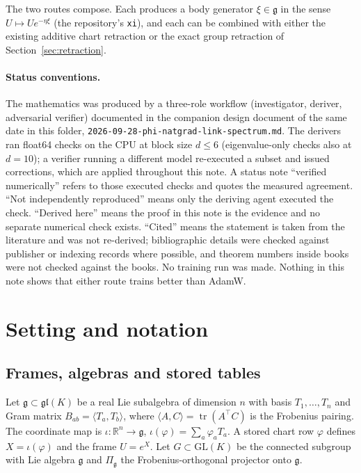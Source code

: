 \documentclass[11pt]{article}
\theoremstyle{definition}
\theoremstyle{remark}
\newcommand{\R}{\mathbb{R}}
\newcommand{\g}{\mathfrak{g}}
\newcommand{\gl}{\mathfrak{gl}}
\newcommand{\GL}{\mathrm{GL}}
\newcommand{\tr}{\operatorname{tr}}
\newcommand{\ip}[2]{\langle #1, #2\rangle}
\begin{document}
The two routes compose. Each produces a body generator $\xi\in\g$ in the sense $U\mapsto Ue^{-\eta\xi}$ (the repository's \texttt{xi}), and each can be combined with either the existing additive chart retraction or the exact group retraction of Section~\ref{sec:retraction}.

\paragraph{Status conventions.} The mathematics was produced by a three-role workflow (investigator, deriver, adversarial verifier) documented in the companion design document of the same date in this folder, \texttt{2026-09-28-phi-natgrad-link-spectrum.md}. The derivers ran float64 checks on the CPU at block size $d\le6$ (eigenvalue-only checks also at $d=10$); a verifier running a different model re-executed a subset and issued corrections, which are applied throughout this note. A status note ``verified numerically'' refers to those executed checks and quotes the measured agreement. ``Not independently reproduced'' means only the deriving agent executed the check. ``Derived here'' means the proof in this note is the evidence and no separate numerical check exists. ``Cited'' means the statement is taken from the literature and was not re-derived; bibliographic details were checked against publisher or indexing records where possible, and theorem numbers inside books were not checked against the books. No training run was made. Nothing in this note shows that either route trains better than AdamW.

\section{Setting and notation}\label{sec:setting}

\subsection{Frames, algebras and stored tables}

Let $\g\subset\gl(K)$ be a real Lie subalgebra of dimension $n$ with basis $T_1,\dots,T_n$ and Gram matrix $B_{ab}=\ip{T_a}{T_b}$, where $\ip{A}{C}=\tr(A^\top C)$ is the Frobenius pairing. The coordinate map is $\iota:\R^n\to\g$, $\iota(\varphi)=\sum_a\varphi_aT_a$. A stored chart row $\varphi$ defines $X=\iota(\varphi)$ and the frame $U=e^X$. Let $G\subset\GL(K)$ be the connected subgroup with Lie algebra $\g$ and $\Pi_\g$ the Frobenius-orthogonal projector onto $\g$.
\end{document}
